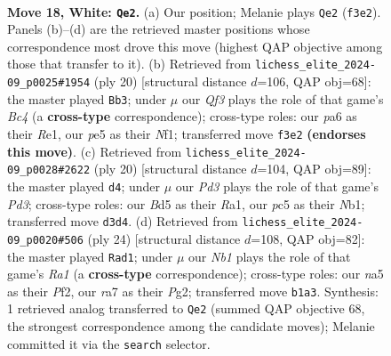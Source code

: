 \documentclass[11pt]{article}
\begin{document}
\clearpage

\begin{figure}[p]\centering
\begin{subfigure}{0.46\textwidth}\centering
\resizebox{\linewidth}{!}{%
\newchessgame
\chessboard[
  setfen={2bqnr2/r3bpkp/p2p2p1/n1pBp3/Pp2P3/3P1Q1N/1PPB1PPP/RN2R1K1 w - - 4 18},
  showmover=false,
  pgfstyle=straightmove, color=movearrow, markmove={f3-e2}
]}
\caption{}
\end{subfigure}\hfill
\begin{subfigure}{0.46\textwidth}\centering
\resizebox{\linewidth}{!}{%
\newchessgame
\chessboard[
  setfen={r1bq1rk1/pp3ppp/1bpp1nn1/4p3/1PB1P3/2PP1N2/P4PPP/R1BQRNK1 w - - 0 11},
  showmover=false,
  pgfstyle=straightmove, color=movearrow, markmove={c4-b3}
]}
\caption{}
\end{subfigure}
\\[4pt]
\begin{subfigure}{0.46\textwidth}\centering
\resizebox{\linewidth}{!}{%
\newchessgame
\chessboard[
  setfen={r1bq1rk1/1pp2p1n/2np3p/p1b1p1p1/P1B1P3/2PP1NB1/1P3PPP/RN1Q1RK1 w - - 2 11},
  showmover=false,
  pgfstyle=straightmove, color=movearrow, markmove={d3-d4}
]}
\caption{}
\end{subfigure}\hfill
\begin{subfigure}{0.46\textwidth}\centering
\resizebox{\linewidth}{!}{%
\newchessgame
\chessboard[
  setfen={rn1qr1k1/2p1bppp/1p1p1n2/p3p3/P1P1P3/BPNQ1N2/2P2PPP/R3R1K1 w - - 4 13},
  showmover=false,
  pgfstyle=straightmove, color=movearrow, markmove={a1-d1}
]}
\caption{}
\end{subfigure}
\caption{\textbf{Move 18, White: \texttt{Qe2}.} (a) Our position; Melanie plays \texttt{Qe2} (\texttt{f3e2}). Panels (b)--(d) are the retrieved master positions whose correspondence most drove this move (highest QAP objective among those that transfer to it). (b) Retrieved from \texttt{lichess\_elite\_2024-09\_p0025\#1954} (ply 20) [structural distance $d$=106, QAP obj=68]: the master played \texttt{Bb3}; under $\mu$ our \emph{Qf3} plays the role of that game's \emph{Bc4} (a \textbf{cross-type} correspondence); cross-type roles: our \emph{p}a6 as their \emph{R}e1, our \emph{p}e5 as their \emph{N}f1; transferred move \texttt{f3e2} \textbf{(endorses this move)}. (c) Retrieved from \texttt{lichess\_elite\_2024-09\_p0028\#2622} (ply 20) [structural distance $d$=104, QAP obj=89]: the master played \texttt{d4}; under $\mu$ our \emph{Pd3} plays the role of that game's \emph{Pd3}; cross-type roles: our \emph{B}d5 as their \emph{R}a1, our \emph{p}c5 as their \emph{N}b1; transferred move \texttt{d3d4}. (d) Retrieved from \texttt{lichess\_elite\_2024-09\_p0020\#506} (ply 24) [structural distance $d$=108, QAP obj=82]: the master played \texttt{Rad1}; under $\mu$ our \emph{Nb1} plays the role of that game's \emph{Ra1} (a \textbf{cross-type} correspondence); cross-type roles: our \emph{n}a5 as their \emph{P}f2, our \emph{r}a7 as their \emph{P}g2; transferred move \texttt{b1a3}. Synthesis: 1 retrieved analog transferred to \texttt{Qe2} (summed QAP objective 68, the strongest correspondence among the candidate moves); Melanie committed it via the \texttt{search} selector.}
\label{fig:thought-m34}
\end{figure}
\end{document}
